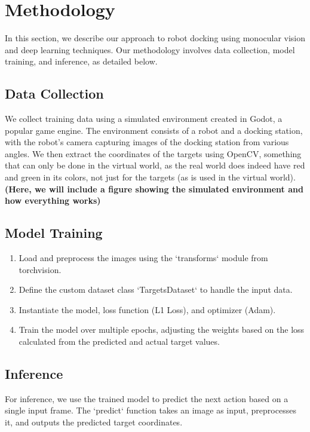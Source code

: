 \section{Methodology}
In this section, we describe our approach to robot docking using monocular vision and deep learning techniques. Our methodology involves data collection, model training, and inference, as detailed below.

\subsection{Data Collection}
We collect training data using a simulated environment created in Godot, a popular game engine. The environment consists of a robot and a docking station, with the robot's camera capturing images of the docking station from various angles. We then extract the coordinates of the targets using OpenCV, something that can only be done in the virtual world, as the real world does indeed have red and green in its colors, not just for the targets (as is used in the virtual world).
\textbf{(Here, we will include a figure showing the simulated environment and how everything works)}

\subsection{Model Training}
\begin{enumerate}
    \item Load and preprocess the images using the `transforms` module from torchvision.
    \item Define the custom dataset class `TargetsDataset` to handle the input data.
    \item Instantiate the model, loss function (L1 Loss), and optimizer (Adam).
    \item Train the model over multiple epochs, adjusting the weights based on the loss calculated from the predicted and actual target values.
\end{enumerate}

\subsection{Inference}
For inference, we use the trained model to predict the next action based on a single input frame. The `predict` function takes an image as input, preprocesses it, and outputs the predicted target coordinates.

